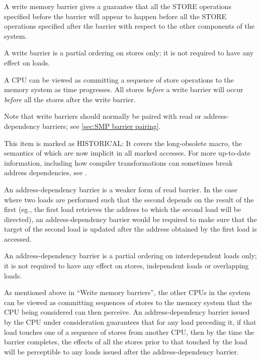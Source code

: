 \begin{description}[style=nextline]
 \item[Write (or store) memory barriers:]
     A write memory barrier gives a guarantee that all the STORE operations
     specified before the barrier will appear to happen before all the STORE
     operations specified after the barrier with respect to the other
     components of the system.

     A write barrier is a partial ordering on stores only; it is not required
     to have any effect on loads.

     A CPU can be viewed as committing a sequence of store operations to the
     memory system as time progresses.
     All stores \emph{before} a write barrier will occur \emph{before} all
     the stores after the write barrier.

     \begin{Note}
     Note that write barriers should normally be paired with read or
     address-dependency barriers; see \cref{sec:SMP barrier pairing}.
     \end{Note}


 \item[Address-dependency barriers (HISTORICAL):]

     \begin{Note}
     This item is marked as HISTORICAL\@:
     It covers the long-obsolete  macro,
     the semantics of which are now implicit in all marked accesses.
     For more up-to-date information, including how compiler transformations
     can sometimes break address dependencies, see
     .
     \end{Note}

     An address-dependency barrier is a weaker form of read barrier.
     In the case where two loads are performed such that the second depends
     on the result of the first (eg., the first load retrieves the address
     to which the second load will be directed), an address-dependency
     barrier would be required to make sure that the target of the second
     load is updated after the address obtained by the first load is
     accessed.

     An address-dependency barrier is a partial ordering on interdependent
     loads only; it is not required to have any effect on stores, independent
     loads or overlapping loads.

     As mentioned above in ``Write memory barriers'',
     the other CPUs in the system can be viewed as
     committing sequences of stores to the memory system that the CPU being
     considered can then perceive.
     An address-dependency barrier issued by the CPU under consideration
     guarantees that for any load preceding it, if that load touches one of
     a sequence of stores from another CPU, then by the time the barrier
     completes, the effects of all the stores prior to that touched by the
     load will be perceptible to any loads issued after the
     address-dependency barrier.


\end{description}
